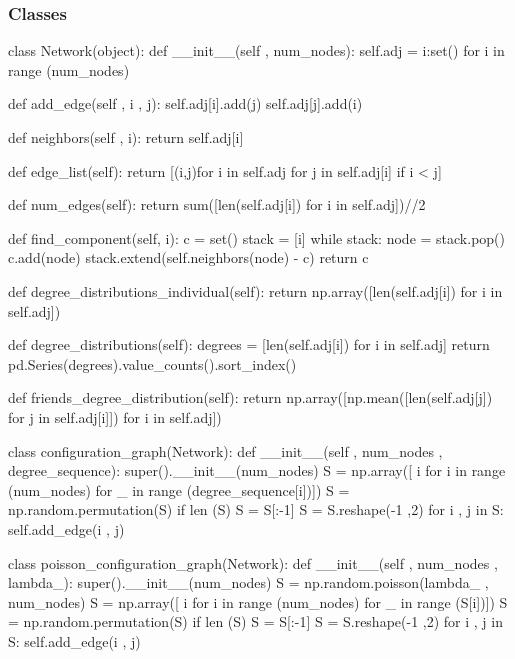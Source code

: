 \documentclass[a4paper, 11pt, oneside]{report}
\begin{document}
\subsubsection*{Classes}
\begin{verbnobox}[\fontsize{8pt}{8pt}\selectfont \mbox{}]
class Network(object):
    def __init__(self , num_nodes):
        self.adj = {i:set() for i in range (num_nodes)}

    def add_edge(self , i , j):
        self.adj[i].add(j)
        self.adj[j].add(i)

    def neighbors(self , i):
        return self.adj[i]
    
    def edge_list(self):
        return [(i,j)for i in self.adj for j in self.adj[i] if i < j]
    
    def num_edges(self):
        return sum([len(self.adj[i]) for i in self.adj])//2
    
    def find_component(self, i):
        c = set()
        stack = [i]
        while stack:
            node = stack.pop()
            c.add(node)
            stack.extend(self.neighbors(node) - c)
        return c
    
    def degree_distributions_individual(self):
        return np.array([len(self.adj[i]) for i in self.adj])
    
    def degree_distributions(self):
        degrees = [len(self.adj[i]) for i in self.adj]
        return pd.Series(degrees).value_counts().sort_index()
    
    def friends_degree_distribution(self):
        return np.array([np.mean([len(self.adj[j]) for j in self.adj[i]]) for i in self.adj])

class configuration_graph(Network):
    def __init__(self , num_nodes , degree_sequence):
        super().__init__(num_nodes)
        S = np.array([ i for i in range (num_nodes) for _ in range (degree_sequence[i])])
        S = np.random.permutation(S)
        if len (S) %
            S = S[:-1]
        S = S.reshape(-1 ,2)
        for i , j in S:
            self.add_edge(i , j)

class poisson_configuration_graph(Network):
    def __init__(self , num_nodes , lambda_):
        super().__init__(num_nodes)
        S = np.random.poisson(lambda_ , num_nodes)
        S = np.array([ i for i in range (num_nodes) for _ in range (S[i])])
        S = np.random.permutation(S)
        if len (S) %
            S = S[:-1]
        S = S.reshape(-1 ,2)
        for i , j in S:
            self.add_edge(i , j)


\end{verbnobox}
\end{document}
